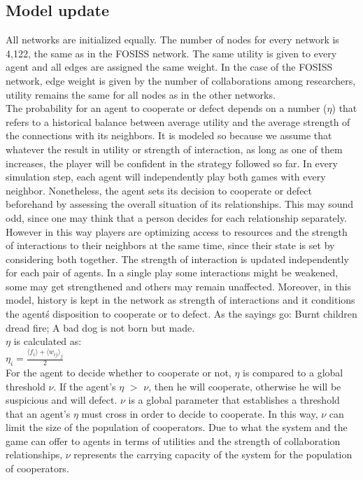 \documentclass{bmcart}
\begin{document}
\subsection*{Model update}

All networks are initialized equally. The number of nodes for every
network is 4,122, the same as in the FOSISS network.  The same utility
is given to every agent and all edges are assigned the same weight. In
the case of the FOSISS network, edge weight is given by the number of
collaborations among researchers, utility remains the same for all
nodes as in the other networks.\\

The probability for an agent to cooperate or defect depends on a
number ($\eta$) that refers to a historical balance between average
utility and the average strength of the connections with its
neighbors. It is modeled so because we assume that whatever the result
in utility or strength of interaction, as long as one of them
increases, the player will be confident in the strategy followed so
far. In every simulation step, each agent will independently play both games with
every neighbor. Nonetheless, the agent sets its decision to cooperate or defect beforehand
by assessing the overall situation of its relationships. This may
sound odd, since one may think that a person decides for each
relationship separately. However in this way players are optimizing
access to resources and the strength of interactions to their
neighbors at the same time, since their state is set by
considering both together. The strength of interaction is updated independently for each pair of agents.  In a single play some interactions might be weakened, some may get strengthened and others may remain unaffected. Moreover, in this model, history is kept in the network as strength of interactions and it conditions the agent\'s disposition to cooperate or to defect. As the sayings go: Burnt children dread fire; A bad dog is not born but made.\\


$\eta$ is calculated as:\\ 


$\eta_i = \frac{\langle f_i \rangle + \langle w_{ij} \rangle _j}{2}$\\

For the agent to decide whether to cooperate or not, $\eta$ is
compared to a global threshold $\nu$. If the agent's $\eta$ $>$ $\nu$,
then he will cooperate, otherwise he will be suspicious and
will defect. $\nu$ is a global parameter that establishes a threshold
that an agent's $\eta$ must cross in order to decide to cooperate. In
this way, $\nu$ can limit the size of the population of
cooperators. Due to what the system and the game can offer to agents
in terms of utilities and the strength of collaboration relationships,
$\nu$ represents the carrying capacity of the
system for the population of cooperators.\\
\end{document}
